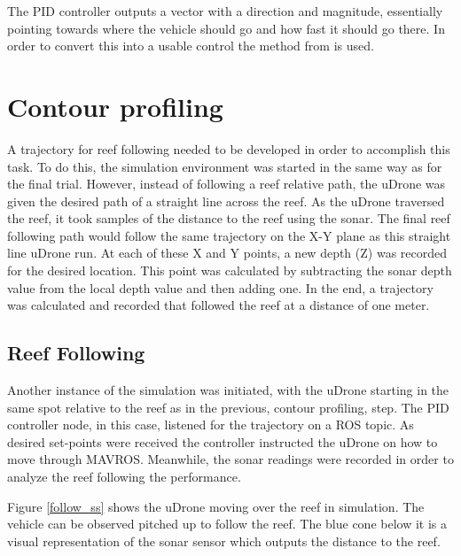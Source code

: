 The PID controller outputs a vector with a direction and magnitude, essentially pointing towards where the vehicle should go and how fast it should go there. In order to convert this into a usable control the method from \cite{faf} is used.

\section{Contour profiling}\label{contour}

A trajectory for reef following needed to be developed in order to accomplish this task. To do this, the simulation environment was started in the same way as for the final trial. However, instead of following a reef relative path, the uDrone was given the desired path of a straight line across the reef. As the uDrone traversed the reef, it took samples of the distance to the reef using the sonar. The final reef following path would follow the same trajectory on the X-Y plane as this straight line uDrone run. At each of these X and Y points, a new depth (Z) was recorded for the desired location. This point was calculated by subtracting the sonar depth value from the local depth value and then adding one. In the end, a trajectory was calculated and recorded that followed the reef at a distance of one meter. 

\subsection{Reef Following}

Another instance of the simulation was initiated, with the uDrone starting in the same spot relative to the reef as in the previous, contour profiling, step. The PID controller node, in this case, listened for the trajectory on a ROS topic. As desired set-points were received the controller instructed the uDrone on how to move through MAVROS. Meanwhile, the sonar readings were recorded in order to analyze the reef following the performance. 

Figure \ref{follow_ss} shows the uDrone moving over the reef in simulation. The vehicle can be observed pitched up to follow the reef. The blue cone below it is a visual representation of the sonar sensor which outputs the distance to the reef. 

